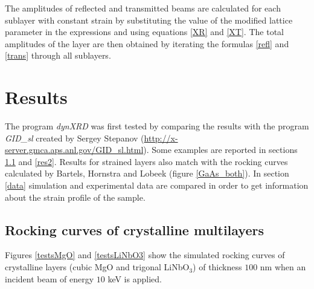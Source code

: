 \documentclass[12pt,oneside,notitlepage,abstracton,a4paper]{scrartcl}
\begin{document}
The amplitudes of reflected and transmitted beams are calculated for each sublayer with constant strain by substituting the value of the modified lattice parameter in the expressions and using equations \ref{XR} and \ref{XT}. The total amplitudes of the layer are then obtained by iterating the formulas \ref{refl} and \ref{trans} through all sublayers.




\section{Results}

The program \textit{dynXRD} was first tested by comparing the results with the program \textit{GID\_sl} created by Sergey Stepanov (\url{http://x-server.gmca.aps.anl.gov/GID_sl.html}). Some examples are reported in sections \ref{res1} and \ref{res2}. Results for strained layers also match with the rocking curves calculated by Bartels, Hornstra and Lobeek \cite{Bartels:a25435} (figure \ref{GaAs_both}). In section \ref{data} simulation and experimental data are compared in order to get information about the strain profile of the sample.


\subsection{Rocking curves of crystalline multilayers}\label{res1}
Figures \ref{testsMgO} and \ref{testsLiNbO3} show the simulated rocking curves of crystalline layers (cubic MgO and trigonal LiNbO$ _3$) of thickness $100$ nm when an incident beam of energy $10$ keV is applied. 
\end{document}

